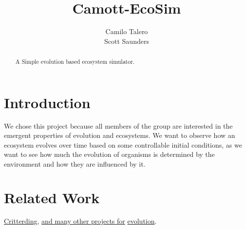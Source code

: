 \documentclass[runningheads]{llncs}
\begin{document}
%
\title{Camott-EcoSim}
%
\author{Camilo Talero \\  Scott Saunders  }
%
%
\maketitle
%
%
\begin{abstract}
A Simple evolution based ecosystem simulator.
\end{abstract}
%
%
\section{Introduction}
\label{sec:Introduction}
%
We chose this project because all members of the group are interested in the emergent properties of evolution and ecosystems. We want to observe how an ecosystem evolves over time based on some controllable initial conditions, as we want to see how much the evolution of organisms is determined by the environment and how they are influenced by it.
%
\section{Related Work}
\href{http://critterding.sourceforge.net/}{Critterding}, \href{https://www.google.ca/search?sclient=psy-ab&safe=off&btnG=Search&q=evolution+sim#safe=off&q=eco+sim}{and many other projects for} \href{https://www.google.ca/search?sclient=psy-ab&safe=off&btnG=Search&q=evolution+sim}{evolution}.
%
\end{document}
